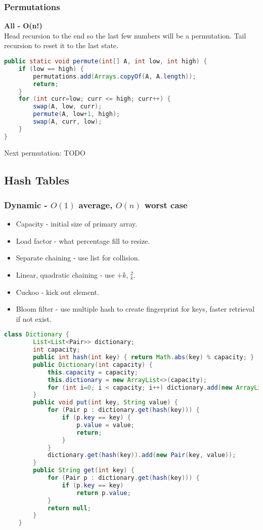 \documentclass[10pt]{article}
\begin{document}
\subsubsection{Permutations}
\textbf{All - O(n!)}\\
Head recursion to the end so the last few numbers will be a permutation. Tail recursion to reset it to the last state.
\begin{lstlisting}[language=java]
public static void permute(int[] A, int low, int high) {
    if (low == high) {
        permutations.add(Arrays.copyOf(A, A.length));
        return;
    }
    for (int curr=low; curr <= high; curr++) {
        swap(A, low, curr);
        permute(A, low+1, high);
        swap(A, curr, low);
    }
}
\end{lstlisting}
Next permutation: TODO

\subsection{Hash Tables}
\subsubsection{Dynamic - $O(1)$ average, $O(n)$ worst case}
\begin{itemize}
    \item Capacity - initial size of primary array.
    \item Load factor - what percentage fill to resize.
    \item Separate chaining - use list for collision.
    \item Linear, quadratic chaining - use $+k$, $_k^2$.
    \item Cuckoo - kick out element.
    \item Bloom filter - use multiple hash to create fingerprint for keys, faster retrieval if not exist.
\end{itemize}
\begin{lstlisting}[language=java]
    class Dictionary {
        List<List<Pair>> dictionary;
        int capacity;
        public int hash(int key) { return Math.abs(key) % capacity; }
        public Dictionary(int capacity) {
            this.capacity = capacity;
            this.dictionary = new ArrayList<>(capacity);
            for (int i=0; i < capacity; i++) dictionary.add(new ArrayList<Pair>());
        }
        public void put(int key, String value) {
            for (Pair p : dictionary.get(hash(key))) {
                if (p.key == key) {
                    p.value = value;
                    return;
                }
            }
            dictionary.get(hash(key)).add(new Pair(key, value));
        }
        public String get(int key) {
            for (Pair p : dictionary.get(hash(key))) {
                if (p.key == key)
                    return p.value;
            }
            return null;
        }
    }
\end{lstlisting}
\end{document}

